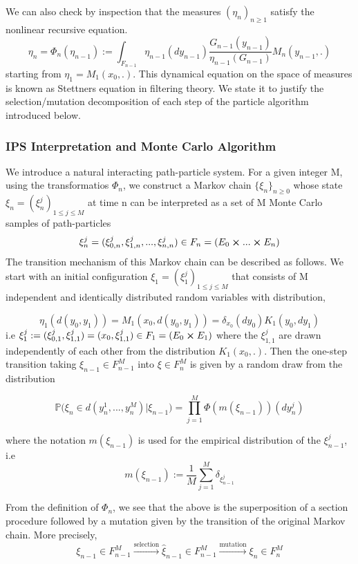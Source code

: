 We can also check by inspection that the measures $(\eta_n)_{n\geq 1}$ satisfy the nonlinear recursive equation.
$$\eta_n = \varPhi_n(\eta_{n-1}) := \int_{F_{n-1}} \eta_{n-1}(dy_{n-1}) \frac{G_{n-1}(y_{n-1})}{\eta_{n-1}(G_{n-1})} M_n(y_{n-1},.)$$
starting from $\eta_1 = M_1(x_0,.)$. This dynamical equation on the space of measures is known as Stettners equation in filtering theory. We state it to justify the selection/mutation decomposition of each step of the particle algorithm introduced below.


\subsubsection{IPS Interpretation and Monte Carlo Algorithm}
We introduce a natural interacting path-particle system. For a given integer M, using the transformatios $\varPhi_n$, we construct a Markov chain $\{\xi_n\}_{n\geq 0}$ whose state $\xi_n = (\xi_n^j)_{1\leq j \leq M}$ at time n can be interpreted as a set of M Monte Carlo samples of path-particles 
$$\xi_n^j = (\xi_{0,n}^j, \xi_{1,n}^j,..., \xi_{n,n}^j) \in F_n = (E_0 \cross ... \cross E_n)$$
The transition mechanism of this Markov chain can be described as follows. We start with an initial configuration $\xi_1 = (\xi_1^j)_{1\leq j \leq M}$ that consists of M independent and identically distributed random variables with distribution,

$$\eta_1(d(y_0,y_1)) = M_1(x_0,d(y_0,y_1)) = \delta_{x_0}(dy_0)K_1(y_0, dy_1) $$
i.e $\xi_1^j := (\xi_{0,1}^j,\xi_{1,1}^j) = (x_0, \xi_{1,1}^j) \in F_1 = (E_0 \cross E_1)$ where the $\xi_{1,1}^j$ are drawn independently of each other from the distribution $K_1(x_0,.)$. Then the one-step transition taking $\xi_{n-1} \in F_{n-1}^M$ into $\xi \in F_n^M$ is given by a random draw from the distribution

\begin{equation}
\mathbb{P}\big( \xi_n \in d(y_n^1,...,y_n^M)|\xi_{n-1}  \big) = \prod_{j=1}^{M}\varPhi(m(\xi_{n-1}))(dy_n^j)
\end{equation}

where the notation $m(\xi_{n-1})$ is used for the empirical distribution of the $\xi_{n-1}^j$, i.e
$$m(\xi_{n-1}) := \frac{1}{M}\sum_{j=1}^{M}\delta_{\xi_{n-1}^{j}}$$

From the definition of $\varPhi_n$, we see that the above is the superposition of a section procedure followed by a mutation given by the transition of the original Markov chain. More precisely,
$$\xi_{n-1} \in F_{n-1}^{M}  \xrightarrow{\text{selection}} \hat{\xi}_{n-1} \in F_{n-1}^M \xrightarrow{\text{mutation}} \xi_n \in F_n^M$$

